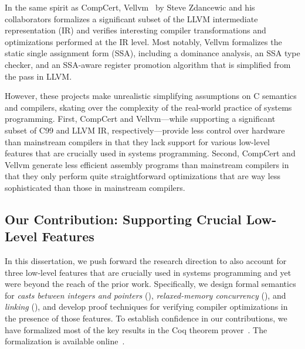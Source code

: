 In the same spirit as CompCert, Vellvm~\cite{vellvm} by Steve Zdancewic and his collaborators
formalizes a significant subset of the LLVM intermediate representation (IR) and verifies
interesting compiler transformations and optimizations performed at the IR level.  Most notably,
Vellvm formalizes the static single assignment form (SSA), including a dominance analysis, an SSA
type checker, and an SSA-aware register promotion algorithm that is simplified from the
 pass in LLVM.


However, these projects make unrealistic simplifying assumptions on C semantics and compilers,
skating over the complexity of the real-world practice of systems programming.  First, CompCert and
Vellvm---while supporting a significant subset of C99 and LLVM IR, respectively---provide less
control over hardware than mainstream compilers in that they lack support for various low-level
features that are crucially used in systems programming.  Second, CompCert and Vellvm generate less
efficient assembly programs than mainstream compilers in that they only perform quite
straightforward optimizations that are way less sophisticated than those in mainstream compilers.



\subsection{Our Contribution: Supporting Crucial Low-Level Features}



In this dissertation, we push forward the research direction to also account for three low-level
features that are crucially used in systems programming and yet were beyond the reach of the prior
work.  Specifically, we design formal semantics for \emph{casts between integers and pointers}
(), \emph{relaxed-memory concurrency} (), and
\emph{linking} (), and develop proof techniques for verifying compiler
optimizations in the presence of those features.  To establish confidence in our contributions, we
have formalized most of the key results in the Coq theorem prover~\cite{coq}.  The formalization is
available online~\cite{kang-phd-thesis-web}.

